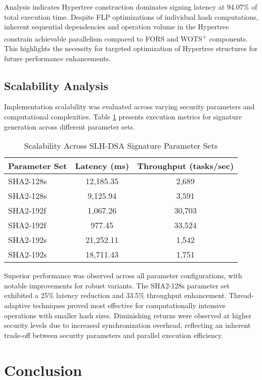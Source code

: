 \documentclass[journal]{IEEEtran}
\begin{document}
Analysis indicates Hypertree construction dominates signing latency at 94.07\% of total execution time. Despite FLP optimizations of individual hash computations, inherent sequential dependencies and operation volume in the Hypertree constrain achievable parallelism compared to FORS and WOTS\textsuperscript{+} components. This highlights the necessity for targeted optimization of Hypertree structures for future performance enhancements.
\subsection{Scalability Analysis}

Implementation scalability was evaluated across varying security parameters and computational complexities. Table \ref{tab:scalability} presents execution metrics for signature generation across different parameter sets.

\begin{table}[h]
  \centering
  \caption{Scalability Across SLH-DSA Signature Parameter Sets}
  \label{tab:scalability}
  \begin{tabular}{@{}lcc@{}}
    \toprule
    \textbf{Parameter Set} & \textbf{Latency (ms)} & \textbf{Throughput (tasks/sec)} \\
    \midrule
    SHA2-128s \cite{Wang2025} & 12,185.35 & 2,689 \\
    SHA2-128s & 9,125.94 & 3,591 \\
    \midrule
    SHA2-192f \cite{Wang2025} & 1,067.26 & 30,703 \\
    SHA2-192f & 977.45 & 33,524 \\
    \midrule
    SHA2-192s \cite{Wang2025} & 21,252.11 & 1,542 \\
    SHA2-192s & 18,711.43 & 1,751 \\
    \bottomrule
  \end{tabular}
\end{table}

Superior performance was observed across all parameter configurations, with notable improvements for robust variants. The SHA2-128s parameter set exhibited a 25\% latency reduction and 33.5\% throughput enhancement. Thread-adaptive techniques proved most effective for computationally intensive operations with smaller hash sizes. Diminishing returns were observed at higher security levels due to increased synchronization overhead, reflecting an inherent trade-off between security parameters and parallel execution efficiency.

\section{Conclusion}\label{sec:conclusion}
\end{document}

